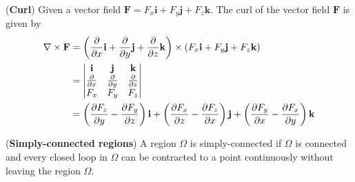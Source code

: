 \documentclass{huhtakm-template-book}
\begin{document}
\begin{defn}(\textbf{Curl})
    Given a vector field $\mathbf{F}=F_{x}\mathbf{i}+F_{y}\mathbf{j}+F_{z}\mathbf{k}$. The curl of the vector field $\mathbf{F}$ is given by
    \begin{align*}
        \nabla\times\mathbf{F}&=\left(\pdv*{}{x}\mathbf{i}+\pdv*{}{y}\mathbf{j}+\pdv*{}{z}\mathbf{k}\right)\times(F_{x}\mathbf{i}+F_{y}\mathbf{j}+F_{z}\mathbf{k})\\
        &=\begin{vmatrix}
            \mathbf{i} & \mathbf{j} & \mathbf{k}\\
            \pdv*{}{x} & \pdv*{}{y} & \pdv*{}{z}\\
            F_{x} & F_{y} & F_{z}
        \end{vmatrix}\\
        &=\left(\pdv{F_{z}}{y}-\pdv{F_{y}}{z}\right)\mathbf{i}+\left(\pdv{F_{x}}{z}-\pdv{F_{z}}{x}\right)\mathbf{j}+\left(\pdv{F_{y}}{x}-\pdv{F_{x}}{y}\right)\mathbf{k}
    \end{align*}
\end{defn}
\begin{defn}(\textbf{Simply-connected regions})
    A region $\Omega$ is simply-connected if $\Omega$ is connected and every closed loop in $\Omega$ can be contracted to a point continuously without leaving the region $\Omega$.
\end{defn}
\end{document}
